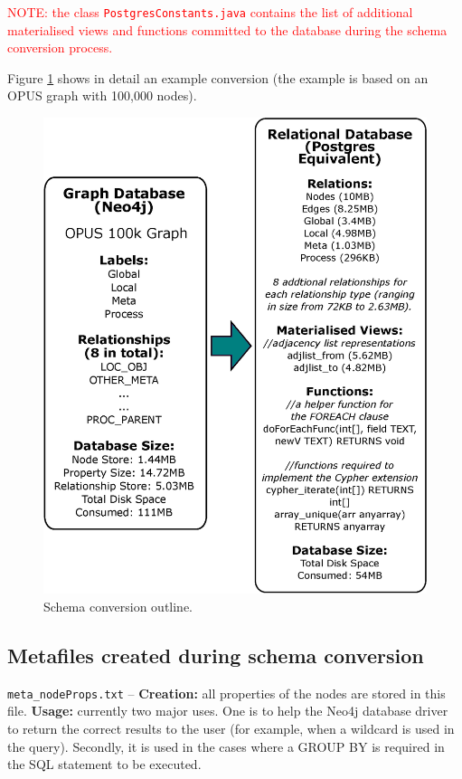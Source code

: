 \documentclass[letterpaper]{ltxdoc}
\begin{document}
\medskip

\textcolor{red}{NOTE: the class \texttt{PostgresConstants.java} contains the list of additional materialised views and functions committed to the database during the schema conversion process.}

\medskip

Figure \ref{schemaConv} shows in detail an example conversion (the example is based on an OPUS graph with 100{,}000 nodes).

\begin{figure}[p]
\centerline{\includegraphics[width=\textwidth,height=\textheight,keepaspectratio]{schemaConv.eps}}
\caption{Schema conversion outline.}
\label{schemaConv}
\end{figure}

\subsection{Metafiles created during schema conversion}
\label{ssec:meta}
\texttt{meta\_nodeProps.txt} -- \textbf{Creation:} all properties of the nodes are stored in this file. \textbf{Usage:} currently two major uses. One is to help the Neo4j database driver to return the correct results to the user (for example, when a wildcard is used in the query). Secondly, it is used in the cases where a GROUP BY is required in the SQL statement to be executed.
\end{document}
